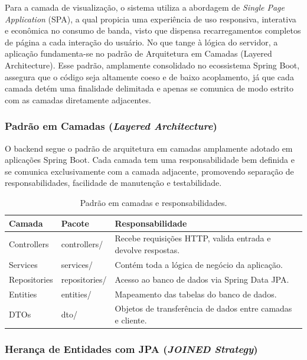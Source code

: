 Para a camada de visualização, o sistema utiliza a abordagem de \textit{Single Page Application} (SPA), a qual propicia uma experiência de uso responsiva, interativa e econômica no consumo de banda, visto que dispensa recarregamentos completos de página a cada interação do usuário. No que tange à lógica do servidor, a aplicação fundamenta-se no padrão de Arquitetura em Camadas (Layered Architecture). Esse padrão, amplamente consolidado no ecossistema Spring Boot, assegura que o código seja altamente coeso e de baixo acoplamento, já que cada camada detém uma finalidade delimitada e apenas se comunica de modo estrito com as camadas diretamente adjacentes.

\subsubsection{Padrão em Camadas (\textit{Layered Architecture})}

O backend segue o padrão de arquitetura em camadas amplamente adotado em aplicações Spring Boot. Cada camada tem uma responsabilidade bem definida e se comunica exclusivamente com a camada adjacente, promovendo separação de responsabilidades, facilidade de manutenção e testabilidade.

\begin{table}[H]
\ABNTEXfontereduzida
\caption[Padrão em camadas e responsabilidades.]{Padrão em camadas e responsabilidades.}
\label{tab-camadas-backend}
\begin{tabular}{p{4.6cm}|p{4.6cm}|p{4.6cm}}
\textbf{Camada} & \textbf{Pacote} & \textbf{Responsabilidade} \\
\hline
Controllers & controllers/ & Recebe requisições HTTP, valida entrada e devolve respostas. \\
\hline
Services & services/ & Contém toda a lógica de negócio da aplicação. \\
\hline
Repositories & repositories/ & Acesso ao banco de dados via Spring Data JPA. \\
\hline
Entities & entities/ & Mapeamento das tabelas do banco de dados. \\
\hline
DTOs & dto/ & Objetos de transferência de dados entre camadas e cliente. \\

\end{tabular}
\end{table}

\subsubsection{Herança de Entidades com JPA (\textit{JOINED Strategy})}

